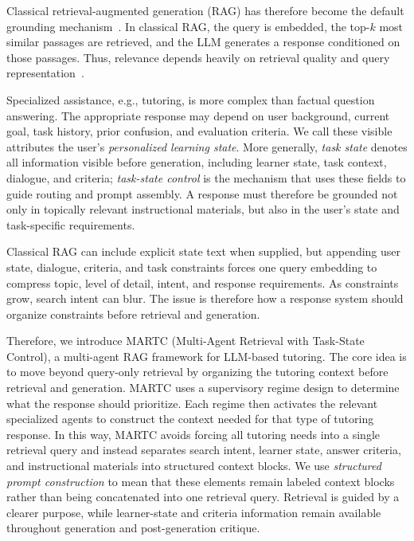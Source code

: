 \documentclass[letterpaper, 10 pt, conference]{ieeeconf}
\begin{document}
Classical retrieval-augmented generation (RAG) has therefore become the default grounding mechanism~\cite{lewis2020rag}. In classical RAG, the query is embedded, the top-$k$ most similar passages are retrieved, and the LLM generates a response conditioned on those passages. Thus, relevance depends heavily on retrieval quality and query representation~\cite{thakur2021beir}.

Specialized assistance, e.g., tutoring, is more complex than factual question answering. The appropriate response may depend on user background, current goal, task history, prior confusion, and evaluation criteria. We call these visible attributes the user's \emph{personalized learning state}. More generally, \emph{task state} denotes all information visible before generation, including learner state, task context, dialogue, and criteria; \emph{task-state control} is the mechanism that uses these fields to guide routing and prompt assembly. A response must therefore be grounded not only in topically relevant instructional materials, but also in the user's state and task-specific requirements.

Classical RAG can include explicit state text when supplied, but appending user state, dialogue, criteria, and task constraints forces one query embedding to compress topic, level of detail, intent, and response requirements. As constraints grow, search intent can blur. The issue is therefore how a response system should organize constraints before retrieval and generation.

Therefore, we introduce \textsc{MARTC} (Multi-Agent Retrieval with Task-State Control), a multi-agent RAG framework for LLM-based tutoring. The core idea is to move beyond query-only retrieval by organizing the tutoring context before retrieval and generation. MARTC uses a supervisory regime design to determine what the response should prioritize. Each regime then activates the relevant specialized agents to construct the context needed for that type of tutoring response. In this way, MARTC avoids forcing all tutoring needs into a single retrieval query and instead separates search intent, learner state, answer criteria, and instructional materials into structured context blocks. We use \emph{structured prompt construction} to mean that these elements remain labeled context blocks rather than being concatenated into one retrieval query. Retrieval is guided by a clearer purpose, while learner-state and criteria information remain available throughout generation and post-generation critique.
\end{document}
